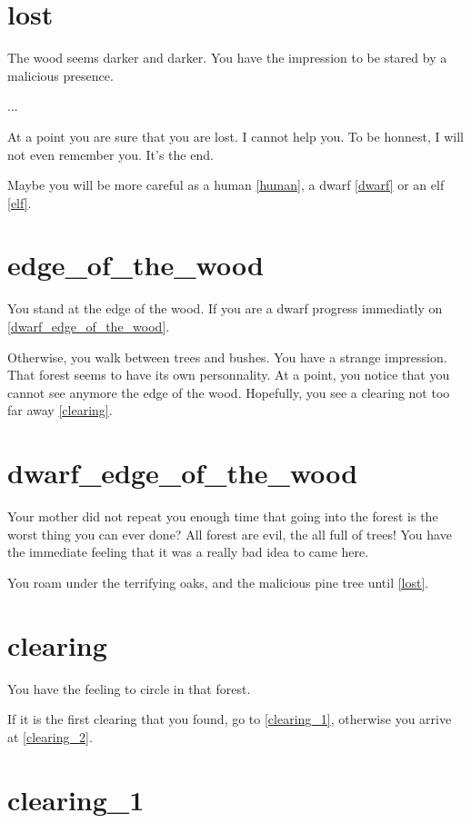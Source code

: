 \section{lost}

The wood seems darker and darker. You have the impression to be stared by a
malicious presence. 

...

At a point you are sure that you are lost. I
cannot help you. To be honnest, I will not even remember you. It's the end.

Maybe you will be more careful as a human \ref{human}, a dwarf \ref{dwarf} or an
elf \ref{elf}.

\section{edge_of_the_wood}

You stand at the edge of the wood. If you are a dwarf progress immediatly on
\ref{dwarf_edge_of_the_wood}.

Otherwise, you walk between trees and bushes. You have a strange impression.
That forest seems to have its own personnality. At a point, you notice that you
cannot see anymore the edge of the wood. Hopefully, you see a clearing not too
far away \ref{clearing}.

\section{dwarf_edge_of_the_wood}

Your mother did not repeat you enough time that going into the forest is the
worst thing you can ever done? All forest are evil, the all full of trees! You
have the immediate feeling that it was a really bad idea to came here.

You roam under the terrifying oaks, and the malicious pine tree until
\ref{lost}.

\section{clearing}

You have the feeling to circle in that forest.

If it is the first clearing that you found, go to \ref{clearing_1}, otherwise
you arrive at \ref{clearing_2}.

\section{clearing_1}

